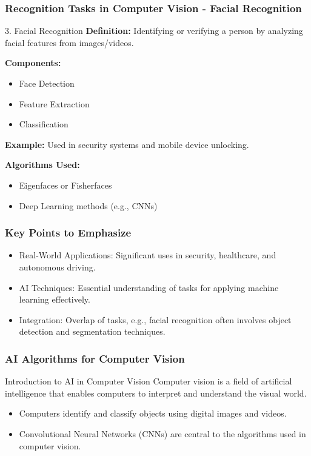 \documentclass[aspectratio=169]{beamer}
\begin{document}
\begin{frame}[fragile]
    \frametitle{Recognition Tasks in Computer Vision - Facial Recognition}
    \begin{block}{3. Facial Recognition}
        \textbf{Definition:} Identifying or verifying a person by analyzing facial features from images/videos.
        
        \textbf{Components:}
        \begin{itemize}
            \item Face Detection
            \item Feature Extraction
            \item Classification
        \end{itemize}
        
        \textbf{Example:} Used in security systems and mobile device unlocking.
        
        \textbf{Algorithms Used:}
        \begin{itemize}
            \item Eigenfaces or Fisherfaces
            \item Deep Learning methods (e.g., CNNs)
        \end{itemize}
    \end{block}
\end{frame}

\begin{frame}[fragile]
    \frametitle{Key Points to Emphasize}
    \begin{itemize}
        \item Real-World Applications: Significant uses in security, healthcare, and autonomous driving.
        \item AI Techniques: Essential understanding of tasks for applying machine learning effectively.
        \item Integration: Overlap of tasks, e.g., facial recognition often involves object detection and segmentation techniques.
    \end{itemize}
\end{frame}

\begin{frame}
    \frametitle{AI Algorithms for Computer Vision}
    \begin{block}{Introduction to AI in Computer Vision}
        Computer vision is a field of artificial intelligence that enables computers to interpret and understand the visual world. 
    \end{block}
    \begin{itemize}
        \item Computers identify and classify objects using digital images and videos.
        \item Convolutional Neural Networks (CNNs) are central to the algorithms used in computer vision.
    \end{itemize}
\end{frame}
\end{document}
